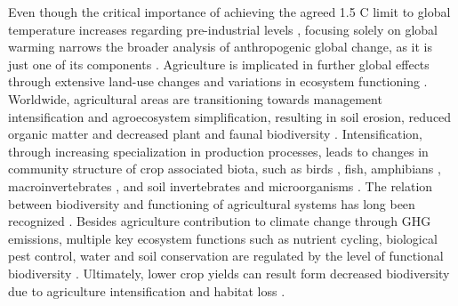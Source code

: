 Even though the critical importance of achieving the agreed 1.5 \degree C limit to global temperature increases regarding pre-industrial levels \citep{agreement2015paris}, focusing solely on global warming narrows the broader analysis of anthropogenic global change, as it is just one of its components \citep{vitousek1994}. Agriculture is implicated in further global effects through extensive land-use changes and variations in ecosystem functioning \citep{tomich2011}. Worldwide, agricultural areas are transitioning towards management intensification and agroecosystem simplification, resulting in soil erosion, reduced organic matter and decreased plant and faunal biodiversity \citep{zimmerer2010}. Intensification, through increasing specialization in production processes, leads to changes in community structure of crop associated biota, such as birds \citep{donald2006further, jeliazkov2016}, fish, amphibians \citep{gopel2020}, macroinvertebrates \citep{perez2023enhanced}, and soil invertebrates and microorganisms \citep{matson1997}. The relation between biodiversity and functioning of agricultural systems has long been recognized \citep{Swift1996-qx}. Besides agriculture contribution to climate change through GHG emissions, multiple key ecosystem functions such as nutrient cycling, biological pest control, water and soil conservation are regulated by the level of functional biodiversity \citep{nicholls1998}. Ultimately, lower crop yields can result form decreased biodiversity due to agriculture intensification and habitat loss \citep{richards2001}.\\   %



